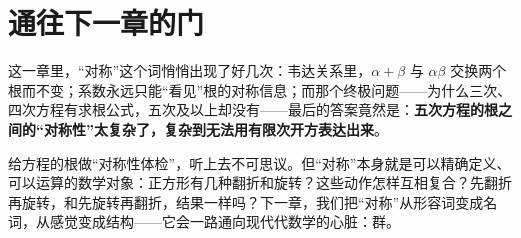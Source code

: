 \section*{通往下一章的门}

这一章里，“对称”这个词悄悄出现了好几次：韦达关系里，$\alpha+\beta$ 与 $\alpha\beta$ 交换两个根而不变；系数永远只能“看见”根的对称信息；而那个终极问题——为什么三次、四次方程有求根公式，五次及以上却没有——最后的答案竟然是：\textbf{五次方程的根之间的“对称性”太复杂了，复杂到无法用有限次开方表达出来}。

给方程的根做“对称性体检”，听上去不可思议。但“对称”本身就是可以精确定义、可以运算的数学对象：正方形有几种翻折和旋转？这些动作怎样互相复合？先翻折再旋转，和先旋转再翻折，结果一样吗？下一章，我们把“对称”从形容词变成名词，从感觉变成结构——它会一路通向现代代数学的心脏：群。
